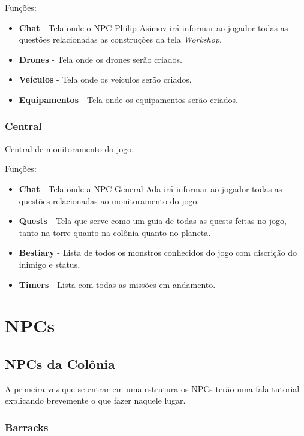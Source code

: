 \documentclass[11pt]{article} %
\begin{document}
Funções:
\begin{itemize}
  \item \textbf{Chat} - Tela onde o NPC Philip Asimov irá informar ao jogador todas as questões relacionadas as construções da tela \textit{Workshop}.
  \item \textbf{Drones} - Tela onde os drones serão criados.
  \item \textbf{Veículos} - Tela onde os veículos serão criados.
  \item \textbf{Equipamentos} - Tela onde os equipamentos serão criados. 
\end{itemize}

\subsubsection{Central}
Central de monitoramento do jogo.

Funções:
\begin{itemize}
  \item \textbf{Chat} - Tela onde a NPC General Ada irá informar ao jogador todas as questões relacionadas ao monitoramento do jogo.
  \item \textbf{Quests} - Tela que serve como um guia de todas as quests feitas no jogo, tanto na torre quanto na colônia quanto no planeta.
  \item \textbf{Bestiary} - Lista de todos os monstros conhecidos do jogo com discrição do inimigo e status.
  \item \textbf{Timers} - Lista com todas as missões em andamento.
\end{itemize}

\section{NPCs}

\subsection{NPCs da Colônia}
A primeira vez que se entrar em uma estrutura os NPCs terão uma fala tutorial explicando brevemente o que fazer naquele lugar.

\subsubsection{Barracks}
\end{document}

